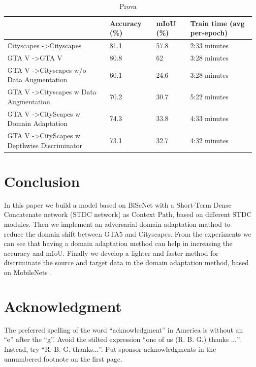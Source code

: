 \documentclass[conference]{IEEEtran}
\begin{document}
\begin{table}[]
\caption{Prova}
\label{TrainingTimaAndAccuracy}
\begin{tabular}{@{}llll@{}}
\toprule
                                                         & Accuracy (\%) & mIoU (\%) & Train time (avg per-epoch) \\ \midrule
Cityscapes -\textgreater Cityscapes                      & 81.1          & 57.8      & 2:33 minutes               \\
GTA V -\textgreater GTA V                                & 80.8          & 62        & 3:28 minutes               \\
GTA V -\textgreater Cityscapes w/o Data Augmentation     & 60.1          & 24.6      & 3:28 minutes               \\
GTA V -\textgreater Cityscapes w Data Augmentation       & 70.2          & 30.7      & 5:22 minutes               \\
GTA V -\textgreater CityScapes w Domain Adaptation       & 74.3          & 33.8      & 4:33 minutes               \\
GTA V -\textgreater CityScapes w Depthwise Discriminator & 73.1          & 32.7      & 4:32 minutes               \\ \bottomrule
\end{tabular}
\end{table}

\section{Conclusion}

In this paper we build a model based on BiSeNet \cite{b2} with a Short-Term Dense Concatenate network (STDC network) \cite{b1} as Context Path, 
based on different STDC modules. Then we implement an adversarial domain adaptation mathod \cite{b3} to reduce the domain shift between GTA5
and Cityscapes. From the experiments we can see that having a domain adaptation method can help in increasing the accuracy and mIoU. 
Finally we develop a lighter and faster method for discriminate the source and target data in the domain adaptation
method, based on MobileNets \cite{b6}. 

\section*{Acknowledgment}

The preferred spelling of the word ``acknowledgment'' in America is without 
an ``e'' after the ``g''. Avoid the stilted expression ``one of us (R. B. 
G.) thanks $\ldots$''. Instead, try ``R. B. G. thanks$\ldots$''. Put sponsor 
acknowledgments in the unnumbered footnote on the first page.
\end{document}
